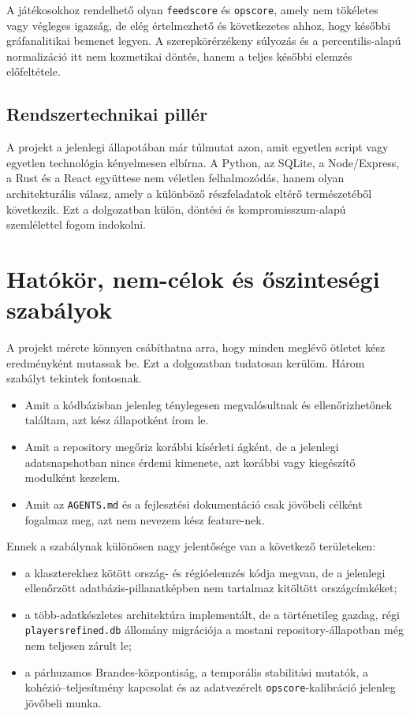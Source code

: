 \documentclass[a4paper,12pt]{report}
\begin{document}
A játékosokhoz rendelhető olyan \texttt{feedscore} és \texttt{opscore}, amely nem tökéletes vagy végleges igazság, de elég értelmezhető és következetes ahhoz, hogy későbbi gráfanalitikai bemenet legyen. A szerepkörérzékeny súlyozás és a percentilis-alapú normalizáció itt nem kozmetikai döntés, hanem a teljes későbbi elemzés előfeltétele.

\subsection{Rendszertechnikai pillér}

A projekt a jelenlegi állapotában már túlmutat azon, amit egyetlen script vagy egyetlen technológia kényelmesen elbírna. A Python, az SQLite, a Node/Express, a Rust és a React együttese nem véletlen felhalmozódás, hanem olyan architekturális válasz, amely a különböző részfeladatok eltérő természetéből következik. Ezt a dolgozatban külön, döntési és kompromisszum-alapú szemlélettel fogom indokolni.

\section{Hatókör, nem-célok és őszinteségi szabályok}

A projekt mérete könnyen csábíthatna arra, hogy minden meglévő ötletet kész eredményként mutassak be. Ezt a dolgozatban tudatosan kerülöm. Három szabályt tekintek fontosnak.

\begin{itemize}
    \item Amit a kódbázisban jelenleg ténylegesen megvalósultnak és ellenőrizhetőnek találtam, azt kész állapotként írom le.
    \item Amit a repository megőriz korábbi kísérleti ágként, de a jelenlegi adatsnapshotban nincs érdemi kimenete, azt korábbi vagy kiegészítő modulként kezelem.
    \item Amit az \texttt{AGENTS.md} és a fejlesztési dokumentáció csak jövőbeli célként fogalmaz meg, azt nem nevezem kész feature-nek.
\end{itemize}

Ennek a szabálynak különösen nagy jelentősége van a következő területeken:

\begin{itemize}
    \item a klaszterekhez kötött ország- és régióelemzés kódja megvan, de a jelenlegi ellenőrzött adatbázis-pillanatképben nem tartalmaz kitöltött országcímkéket;
    \item a több-adatkészletes architektúra implementált, de a történetileg gazdag, régi \texttt{playersrefined.db} állomány migrációja a mostani repository-állapotban még nem teljesen zárult le;
    \item a párhuzamos Brandes-központiság, a temporális stabilitási mutatók, a kohézió--teljesítmény kapcsolat és az adatvezérelt \texttt{opscore}-kalibráció jelenleg jövőbeli munka.
\end{itemize}
\end{document}
